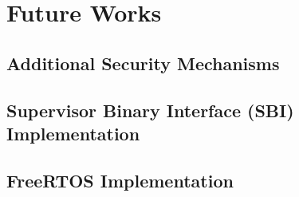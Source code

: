 \chapter{Future Works}
\label{cha:future}

\lipsum[1]

\section{Additional Security Mechanisms}
\label{sec:future_security}

\lipsum[1]

\section{Supervisor Binary Interface (SBI) Implementation}
\label{sec:future_sbi}

\lipsum[1]

\section{FreeRTOS Implementation}
\label{sec:future_rtos}

\lipsum[1]
